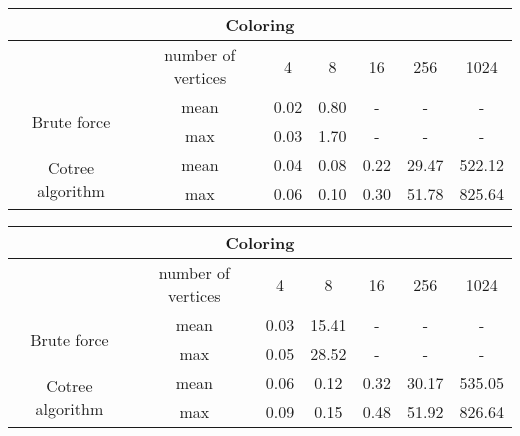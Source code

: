 \begin{center}
    \begin{tabular}{|c|c|c|c|c|c|c|}
        \hline
        \multicolumn{7}{|c|}{Coloring}                                                               \\
        \hline
                                          & number of vertices & 4    & 8    & 16   & 256   & 1024   \\
        \hline

        \multirow{2}{*}{Brute force}      & mean               & 0.02 & 0.80 & -    & -     & -      \\
                                          & max                & 0.03 & 1.70 & -    & -     & -      \\
        \hline
        \multirow{2}{*}{Cotree algorithm} & mean               & 0.04 & 0.08 & 0.22 & 29.47 & 522.12 \\
                                          & max                & 0.06 & 0.10 & 0.30 & 51.78 & 825.64 \\
        \hline
    \end{tabular}
\end{center}

\begin{center}
    \begin{tabular}{|c|c|c|c|c|c|c|}
        \hline
        \multicolumn{7}{|c|}{Coloring}                                                                \\
        \hline
                                          & number of vertices & 4    & 8     & 16   & 256   & 1024   \\
        \hline

        \multirow{2}{*}{Brute force}      & mean               & 0.03 & 15.41 & -    & -     & -      \\
                                          & max                & 0.05 & 28.52 & -    & -     & -      \\
        \hline
        \multirow{2}{*}{Cotree algorithm} & mean               & 0.06 & 0.12  & 0.32 & 30.17 & 535.05 \\
                                          & max                & 0.09 & 0.15  & 0.48 & 51.92 & 826.64 \\
        \hline
    \end{tabular}
\end{center}
